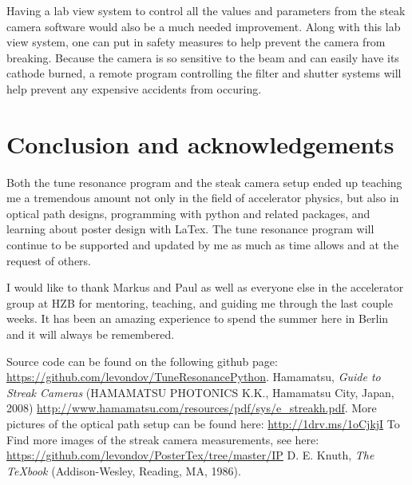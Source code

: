 \documentclass[%
 reprint,%
 amssymb, amsmath,%
 aip,cha,%
]{revtex4-1}
\begin{document}
Having a lab view system to control all the values and parameters from the steak camera software would also be a much needed improvement. Along with this lab view system, one can put in safety measures to help prevent the camera from breaking. Because the camera is so sensitive to the beam and can easily have its cathode burned, a remote program controlling the filter and shutter systems will help prevent any expensive accidents from occuring.

\section{Conclusion and acknowledgements}
Both the tune resonance program and the steak camera setup ended up teaching me a tremendous amount not only in the field of accelerator physics, but also in optical path designs, programming with python and related packages, and learning about poster design with LaTex. The tune resonance program will continue to be supported and updated by me as much as time allows and at the request of others.

I would like to thank Markus and Paul as well as everyone else in the accelerator group at HZB for mentoring, teaching, and guiding me through the last couple weeks. It has been an amazing experience to spend the summer here in Berlin and it will always be remembered.


\begin{thebibliography}{9}\label{sec:TeXbooks}%
Source code can be found on the following github page: 
\url{https://github.com/levondov/TuneResonancePython}.
%
Hamamatsu,
\emph{Guide to Streak Cameras}
(HAMAMATSU PHOTONICS K.K., Hamamatsu City, Japan, 2008)
\url{http://www.hamamatsu.com/resources/pdf/sys/e_streakh.pdf}.
%
More pictures of the optical path setup can be found here:
\url{http://1drv.ms/1oCjkjI}
%
To Find more images of the streak camera measurements, see here:
\url{https://github.com/levondov/PosterTex/tree/master/IP}
%
D. E. Knuth, 
\emph{The \TeX book} 
(Addison-Wesley, Reading, MA, 1986). 

\end{thebibliography}
\end{document}
